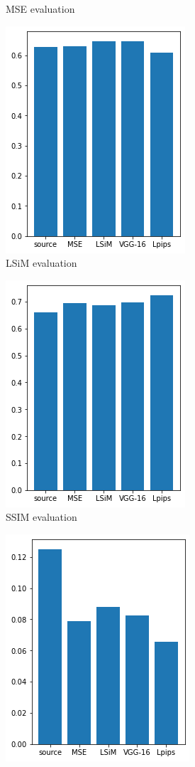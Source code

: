 \documentclass[a4paper,12pt,twoside]{report}
\begin{document}
\begin{figure}
\begin{subfigure}{0.32\textwidth}
		\caption{MSE evaluation}
	\end{subfigure}
	\begin{subfigure}{0.32\textwidth}
		\centering
		\includegraphics[scale=0.49]{karman_low/numeval_lsim.png}
		\caption{LSiM evaluation}
	\end{subfigure}
	\begin{subfigure}{0.32\textwidth}
		\centering
		\includegraphics[scale=0.49]{karman_low/numeval_ssim.png}
		\caption{SSIM evaluation}
	\end{subfigure}
	\begin{subfigure}{0.32\textwidth}
		\centering
		\includegraphics[scale=0.49]{karman_low/numeval_lpips.png}

\end{subfigure}
\end{figure}
\end{document}
